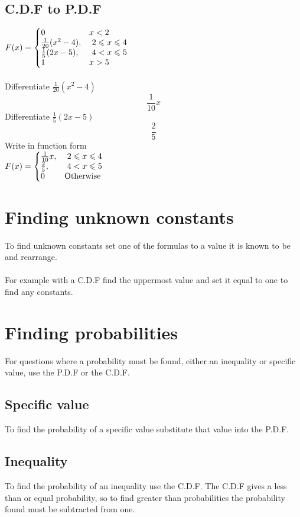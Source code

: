 \documentclass{article}[18pt]
\begin{document}
\subsection{C.D.F to P.D.F}
{\renewcommand{\arraystretch}{1.5}
$
  F(x)=\left\{
  \begin{array}{@{}ll@{}}
  0 & x<2\\
    \frac{1}{20}(x^2-4), & \ 2\leqslant x\leqslant4\\
    \frac{1}{5}(2x-5), & \ 4< x\leqslant5\\
    1 & x>5\\
  \end{array}\right.
$}\\
\\
Differentiate $\frac{1}{20}(x^2-4)$
$$\frac{1}{10}x$$
Differentiate $\frac{1}{5}(2x-5)$
$$\frac{2}{5}$$
Write in function form\\
{\renewcommand{\arraystretch}{1.5}
$
  F(x)=\left\{
  \begin{array}{@{}ll@{}}
    \frac{1}{10}x, & \ 2\leqslant x\leqslant4\\
    \frac{2}{5}, & \ 4< x\leqslant5\\
    0 & \textrm{Otherwise}\\
  \end{array}\right.
$}\\
\newpage
\section{Finding unknown constants}
To find unknown constants set one of the formulas to a value it is known to be and rearrange.\\
\\
For example with a C.D.F find the uppermost value and set it equal to one to find any constants.
\section{Finding probabilities}
For questions where a probability must be found, either an inequality or specific value, use the P.D.F or the C.D.F.
\subsection{Specific value}
To find the probability of a specific value substitute that value into the P.D.F.
\subsection{Inequality}
To find the probability of an inequality use the C.D.F. The C.D.F gives a less than or equal probability, so to find greater than probabilities the probability found must be subtracted from one.
\end{document}
